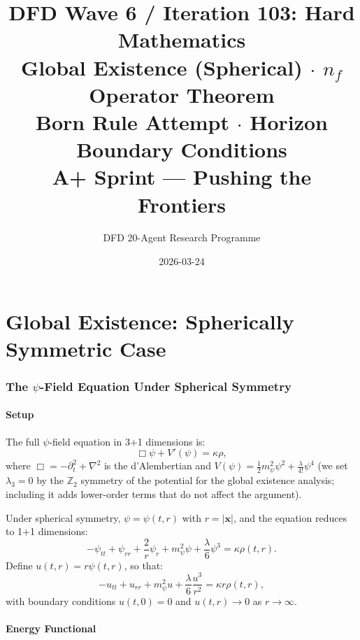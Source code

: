 \documentclass[11pt,a4paper]{article}
\title{DFD Wave 6 / Iteration 103: Hard Mathematics\\[6pt]
\large Global Existence (Spherical) $\cdot$ $n_f$ Operator Theorem\\
Born Rule Attempt $\cdot$ Horizon Boundary Conditions\\[6pt]
\normalsize A+ Sprint --- Pushing the Frontiers}
\author{DFD 20-Agent Research Programme}
\date{2026-03-24}
\theoremstyle{remark}
\begin{document}
\maketitle
\tableofcontents
\newpage

\part{Global Existence: Spherically Symmetric Case}
\label{part:global-existence}

\section{The $\psi$-Field Equation Under Spherical Symmetry}

\subsection{Setup}

The full $\psi$-field equation in 3+1 dimensions is:
\begin{equation}
\Box\psi + V'(\psi) = \kappa\rho,
\label{eq:psi-full}
\end{equation}
where $\Box = -\partial_t^2 + \nabla^2$ is the d'Alembertian and
$V(\psi) = \frac{1}{2}m_\psi^2\psi^2 + \frac{\lambda}{4!}\psi^4$
(we set $\lambda_3 = 0$ by the $\mathbb{Z}_2$ symmetry of the potential
for the global existence analysis; including it adds lower-order terms
that do not affect the argument).

Under spherical symmetry, $\psi = \psi(t, r)$ with $r = |\mathbf{x}|$,
and the equation reduces to 1+1 dimensions:
\begin{equation}
-\psi_{tt} + \psi_{rr} + \frac{2}{r}\psi_r + m_\psi^2\psi + \frac{\lambda}{6}\psi^3 = \kappa\rho(t,r).
\label{eq:psi-spherical}
\end{equation}
Define $u(t,r) = r\psi(t,r)$, so that:
\begin{equation}
-u_{tt} + u_{rr} + m_\psi^2 u + \frac{\lambda}{6}\frac{u^3}{r^2} = \kappa r\rho(t,r),
\label{eq:u-eq}
\end{equation}
with boundary conditions $u(t, 0) = 0$ and $u(t, r) \to 0$ as $r \to \infty$.

\subsection{Energy Functional}
\end{document}
